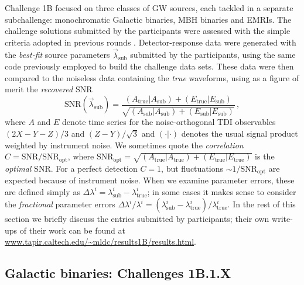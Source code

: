 \documentclass{iopart}
\begin{document}
Challenge 1B focused on three classes of GW sources, each tackled in a separate subchallenge: monochromatic Galactic binaries, MBH binaries and EMRIs. The challenge solutions submitted by the participants were assessed with the simple criteria adopted in previous rounds \cite{mldcgwdaw1, mldcamaldi2}. Detector-response data were generated with the \emph{best-fit} source parameters $\vec{\lambda}_\mathrm{sub}$ submitted by the participants, using the same code previously employed to build the challenge data sets. These data were then compared to the noiseless data containing the \emph{true} waveforms, using as a figure of merit the \emph{recovered} SNR
%
\begin{equation}
\mathrm{SNR}(\vec{\lambda}_\mathrm{sub}) = \frac{(A_\mathrm{true}|A_\mathrm{sub}) + (E_\mathrm{true}|E_\mathrm{sub})} {\sqrt{(A_\mathrm{sub}|A_\mathrm{sub}) + (E_\mathrm{sub}|E_\mathrm{sub})}}\,,
\label{e:SNR}
\end{equation}
%
where $A$ and $E$ denote time series for the noise-orthogonal TDI observables $(2X - Y - Z)/3$ and $(Z - Y)/\sqrt{3}$ \cite{sensitivity} and $(\cdot|\cdot)$ denotes the usual signal product weighted by instrument noise.
We sometimes quote the \emph{correlation} $C = \mathrm{SNR} / \mathrm{SNR}_\mathrm{opt}$, where 
$\mathrm{SNR}_\mathrm{opt} = \sqrt{(A_\mathrm{true}|A_\mathrm{true}) + (E_\mathrm{true}|E_\mathrm{true})}$ is the \emph{optimal} SNR. For a perfect detection $C = 1$, but fluctuations $\sim 1 / \mathrm{SNR}_\mathrm{opt}$ are expected because of instrument noise. When we examine parameter errors, these are defined simply as
$\Delta\lambda^i = \lambda^i_\mathrm{sub} - \lambda^i_\mathrm{true}$; in some cases it makes sense to consider the \emph{fractional} parameter errors $\Delta \lambda^i / \lambda^i = (\lambda^i_\mathrm{sub} - \lambda^i_\mathrm{true}) / \lambda^i_\mathrm{true}$.
In the rest of this section we briefly discuss the entries submitted by participants; their own write-ups of their work can be found at \url{www.tapir.caltech.edu/~mldc/results1B/results.html}.

\subsection{Galactic binaries: Challenges 1B.1.X}
\end{document}

